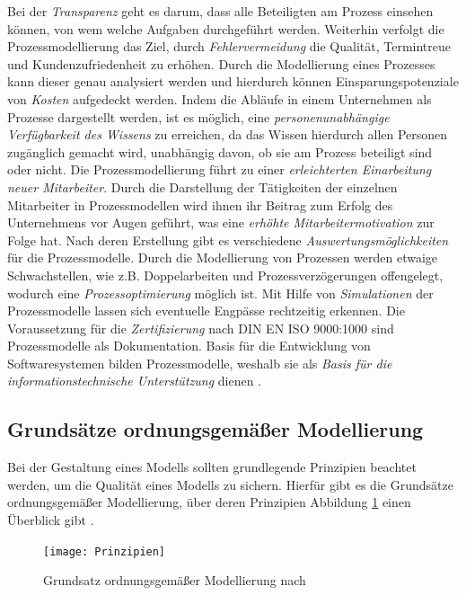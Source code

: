 Bei der \textit{Transparenz} geht es darum, dass alle Beteiligten am Prozess einsehen können, von wem welche Aufgaben durchgeführt werden. Weiterhin verfolgt die Prozessmodellierung das Ziel, durch \textit{Fehlervermeidung} die Qualität, Termintreue und Kundenzufriedenheit zu erhöhen. Durch die Modellierung eines Prozesses kann dieser genau analysiert werden und hierdurch können Einsparungspotenziale von \textit{Kosten} aufgedeckt werden. Indem die Abläufe in einem Unternehmen als Prozesse dargestellt werden, ist es möglich, eine \textit{personenunabhängige Verfügbarkeit des Wissens} zu erreichen, da das Wissen hierdurch allen Personen zugänglich gemacht wird, unabhängig davon, ob sie am Prozess beteiligt sind oder nicht. Die Prozessmodellierung führt zu einer \textit{erleichterten Einarbeitung neuer Mitarbeiter}. Durch die Darstellung der Tätigkeiten der einzelnen Mitarbeiter in Prozessmodellen wird ihnen ihr Beitrag zum Erfolg des Unternehmens vor Augen geführt, was eine \textit{erhöhte Mitarbeitermotivation} zur Folge hat. Nach deren Erstellung gibt es verschiedene \textit{Auswertungsmöglichkeiten} für die Prozessmodelle. Durch die Modellierung von Prozessen werden etwaige Schwachstellen, wie z.B. Doppelarbeiten und Prozessverzögerungen offengelegt, wodurch eine \textit{Prozessoptimierung} möglich ist. Mit Hilfe von \textit{Simulationen} der Prozessmodelle lassen sich eventuelle Engpässe rechtzeitig erkennen. Die Voraussetzung für die \textit{Zertifizierung} nach DIN EN ISO 9000:1000 sind Prozessmodelle als Dokumentation. Basis für die Entwicklung von Softwaresystemen bilden Prozessmodelle, weshalb sie als \textit{Basis für die informationstechnische Unterstützung} dienen \cite{koch2011}.

\subsection{Grundsätze ordnungsgemäßer Modellierung}

Bei der Gestaltung eines Modells sollten grundlegende Prinzipien beachtet werden, um die Qualität eines Modells zu sichern. Hierfür gibt es die Grundsätze ordnungsgemäßer Modellierung, über deren Prinzipien Abbildung \ref{fig:Prinzipien} einen Überblick gibt  \cite{freund2007}.

\begin{figure}[htp]
\begin{center}
  \texttt{[image: Prinzipien]} %
  \caption{Grundsatz ordnungsgemäßer Modellierung nach \cite{journals95}}
  \label{fig:Prinzipien}
\end{center}
\end{figure}

